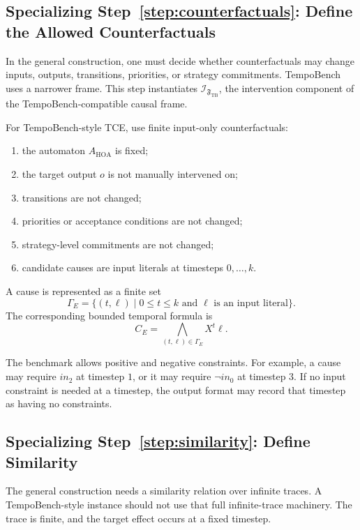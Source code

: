 \documentclass[11pt]{article}
\theoremstyle{remark}
\newcommand{\Frame}{\mathfrak{F}}
\begin{document}
\subsection{Specializing Step~\ref{step:counterfactuals}: Define the Allowed Counterfactuals}

In the general construction, one must decide whether counterfactuals may change
inputs, outputs, transitions, priorities, or strategy commitments. TempoBench
uses a narrower frame. This step instantiates
\(\mathcal{I}_{\Frame_{\mathrm{TB}}}\), the intervention component of the
TempoBench-compatible causal frame.

For TempoBench-style TCE, use finite input-only counterfactuals:
\begin{enumerate}[label=\arabic*.]
  \item the automaton \(A_{\mathrm{HOA}}\) is fixed;
  \item the target output \(o\) is not manually intervened on;
  \item transitions are not changed;
  \item priorities or acceptance conditions are not changed;
  \item strategy-level commitments are not changed;
  \item candidate causes are input literals at timesteps \(0,\ldots,k\).
\end{enumerate}

A cause is represented as a finite set
\[
  \Gamma_E=\{(t,\ell)\mid 0\leq t\leq k
  \text{ and } \ell \text{ is an input literal}\}.
\]
The corresponding bounded temporal formula is
\[
  C_E=\bigwedge_{(t,\ell)\in\Gamma_E} X^t\ell.
\]

The benchmark allows positive and negative constraints. For example, a cause
may require \(in_2\) at timestep \(1\), or it may require \(\neg in_0\) at
timestep \(3\). If no input constraint is needed at a timestep, the output
format may record that timestep as having no constraints.

\subsection{Specializing Step~\ref{step:similarity}: Define Similarity}

The general construction needs a similarity relation over infinite traces. A
TempoBench-style instance should not use that full infinite-trace machinery.
The trace is finite, and the target effect occurs at a fixed timestep.
\end{document}
